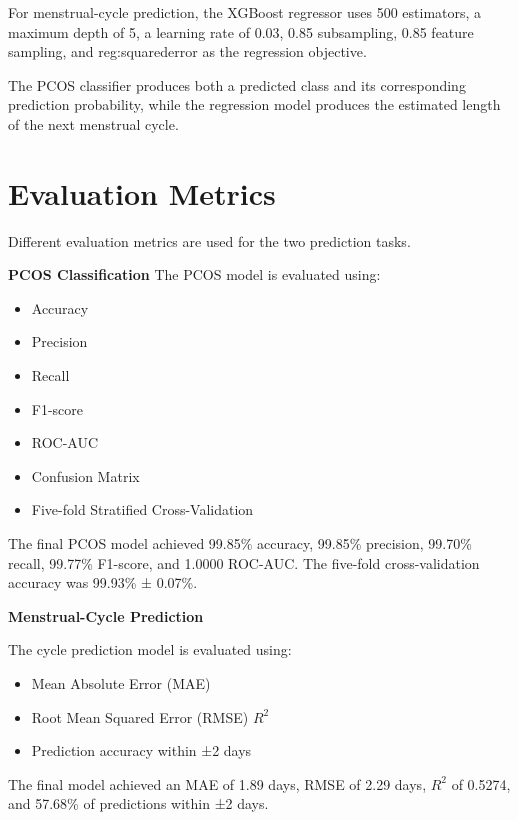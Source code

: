 For menstrual-cycle prediction, the XGBoost regressor uses 500 estimators, a maximum depth of 5, a learning rate of 0.03, 0.85 subsampling, 0.85 feature sampling, and reg:squarederror as the regression objective.

The PCOS classifier produces both a predicted class and its corresponding prediction probability, while the regression model produces the estimated length of the next menstrual cycle.

\section{Evaluation Metrics}
Different evaluation metrics are used for the two prediction tasks.

\textbf{PCOS Classification}
The PCOS model is evaluated using:
\begin{itemize}
    \item Accuracy
    \item Precision
    \item Recall
    \item F1-score
    \item ROC-AUC
    \item Confusion Matrix
    \item Five-fold Stratified Cross-Validation
\end{itemize}

The final PCOS model achieved 99.85\% accuracy, 99.85\% precision, 99.70\% recall, 99.77\% F1-score, and 1.0000 ROC-AUC. The five-fold cross-validation accuracy was 99.93\% ± 0.07\%.

\textbf{Menstrual-Cycle Prediction}

The cycle prediction model is evaluated using:
\begin{itemize}
    \item Mean Absolute Error (MAE)
    \item Root Mean Squared Error (RMSE)
$R^2$
    \item Prediction accuracy within ±2 days
\end{itemize}

The final model achieved an MAE of 1.89 days, RMSE of 2.29 days, $R^2$ of 0.5274, and 57.68\% of predictions within ±2 days.


